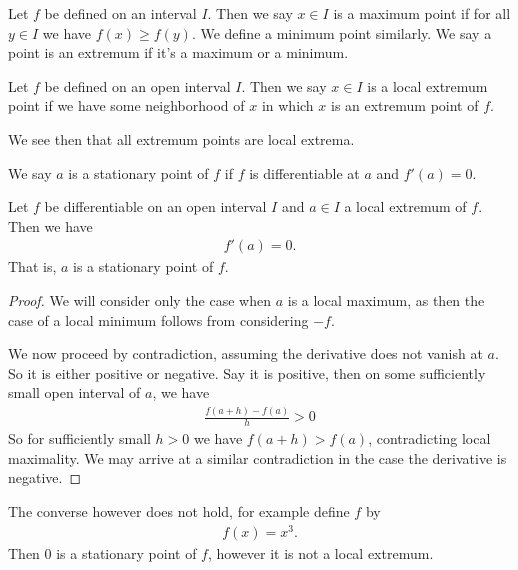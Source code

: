 \documentclass[]{article}
\begin{document}
\begin{defi} 
		Let $f$ be defined on an interval $I$. Then we say $x \in I$ is a maximum point if for all $y \in I$ we have $f(x) \geq f(y)$. We define a minimum point similarly. We say a point is an extremum if it's a maximum or a minimum.
\end{defi}

\begin{defi} 
	Let $f$ be defined on an open interval $I$. Then we say $x \in I$ is a local extremum point if we have some neighborhood of $x$ in which $x$ is an extremum point of $f$.
\end{defi}

We see then that all extremum points are local extrema.

\begin{defi} 
		We say $a$ is a stationary point of $f$ if $f$ is differentiable at $a$ and $f'(a) = 0$.	
\end{defi}

\begin{thm}
		Let $f$ be differentiable on an open interval $I$ and $a \in I$ a local extremum of $f$. Then we have
			\begin{align*}
					f'(a) = 0.
			\end{align*}
			That is, $a$ is a stationary point of $f$.
\end{thm}

\begin{proof}
		We will consider only the case when $a$ is a local maximum, as then the case of a local minimum follows from considering $-f$.

		We now proceed by contradiction, assuming the derivative does not vanish at $a$. So it is either positive or negative. Say it is positive, then on some sufficiently small open interval of $a$, we have 
\begin{align*}
		\frac{f(a+h)-f(a)}{h} > 0
\end{align*}
So for sufficiently small $h > 0$ we have $f(a+h) > f(a)$, contradicting local maximality. We may arrive at a similar contradiction in the case the derivative is negative.
\end{proof}

The converse however does not hold, for example define $f$ by 
\begin{align*}
		f(x) = x^3.
\end{align*}
Then $0$ is a stationary point of $f$, however it is not a local extremum.
\end{document}
